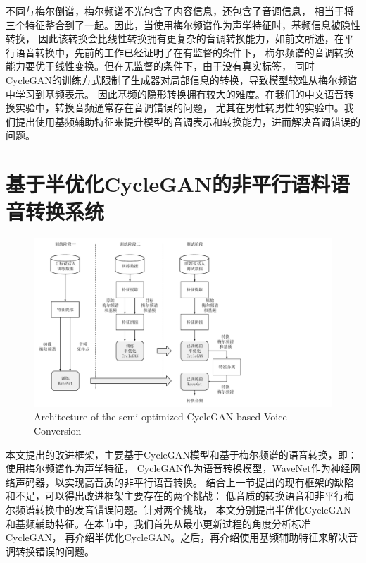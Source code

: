 不同与梅尔倒谱，梅尔频谱不光包含了内容信息，还包含了音调信息，
相当于将三个特征整合到了一起。因此，当使用梅尔频谱作为声学特征时，基频信息被隐性转换，
因此该转换会比线性转换拥有更复杂的音调转换能力，如前文所述，在平行语音转换中，先前的工作已经证明了在有监督的条件下，
梅尔频谱的音调转换能力要优于线性变换。但在无监督的条件下，由于没有真实标签，
同时CycleGAN的训练方式限制了生成器对局部信息的转换，导致模型较难从梅尔频谱中学习到基频表示。
因此基频的隐形转换拥有较大的难度。在我们的中文语音转换实验中，转换音频通常存在音调错误的问题，
尤其在男性转男性的实验中。我们提出使用基频辅助特征来提升模型的音调表示和转换能力，进而解决音调错误的问题。

\section{基于半优化CycleGAN的非平行语料语音转换系统}

\begin{figure}[!htp]
    \centering
    \includegraphics[width=14.5cm,trim=0 0 200 0,clip]{figure/4_proposedarch.pdf}
    {Architecture of the semi-optimized CycleGAN based Voice Conversion}
    \label{fig:proposedarch}
\end{figure}

本文提出的改进框架，主要基于CycleGAN模型和基于梅尔频谱的语音转换，即：使用梅尔频谱作为声学特征，
CycleGAN作为语音转换模型，WaveNet作为神经网络声码器，以实现高音质的非平行语音转换。
结合上一节提出的现有框架的缺陷和不足，可以得出改进框架主要存在的两个挑战：
低音质的转换语音和非平行梅尔频谱转换中的发音错误问题。针对两个挑战，
本文分别提出半优化CycleGAN和基频辅助特征。在本节中，我们首先从最小更新过程的角度分析标准CycleGAN，
再介绍半优化CycleGAN。之后，再介绍使用基频辅助特征来解决音调转换错误的问题。

